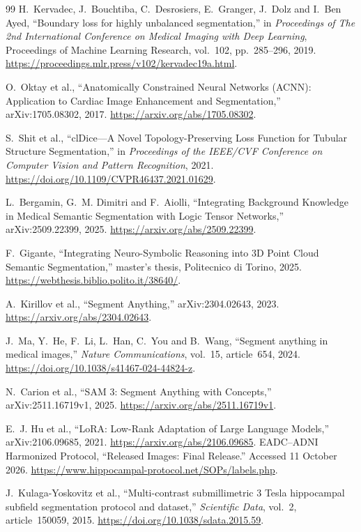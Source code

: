 \documentclass[12pt,a4paper]{article}
\begin{document}
\begin{thebibliography}{99}
H.~Kervadec, J.~Bouchtiba, C.~Desrosiers, E.~Granger, J.~Dolz and
I.~Ben Ayed, ``Boundary loss for highly unbalanced segmentation,''
in \emph{Proceedings of The 2nd International Conference on Medical
Imaging with Deep Learning}, Proceedings of Machine Learning Research,
vol.~102, pp.~285--296, 2019.
\url{https://proceedings.mlr.press/v102/kervadec19a.html}.

O.~Oktay et al., ``Anatomically Constrained Neural Networks (ACNN):
Application to Cardiac Image Enhancement and Segmentation,''
arXiv:1705.08302, 2017. \url{https://arxiv.org/abs/1705.08302}.

S.~Shit et al., ``clDice---A Novel Topology-Preserving Loss Function
for Tubular Structure Segmentation,'' in \emph{Proceedings of the
IEEE/CVF Conference on Computer Vision and Pattern Recognition}, 2021.
\url{https://doi.org/10.1109/CVPR46437.2021.01629}.

L.~Bergamin, G.~M. Dimitri and F.~Aiolli, ``Integrating Background
Knowledge in Medical Semantic Segmentation with Logic Tensor Networks,''
arXiv:2509.22399, 2025. \url{https://arxiv.org/abs/2509.22399}.

F.~Gigante, ``Integrating Neuro-Symbolic Reasoning into 3D Point Cloud
Semantic Segmentation,'' master's thesis, Politecnico di Torino, 2025.
\url{https://webthesis.biblio.polito.it/38640/}.

A.~Kirillov et al., ``Segment Anything,'' arXiv:2304.02643, 2023.
\url{https://arxiv.org/abs/2304.02643}.

J.~Ma, Y.~He, F.~Li, L.~Han, C.~You and B.~Wang,
``Segment anything in medical images,'' \emph{Nature Communications},
vol.~15, article~654, 2024.
\url{https://doi.org/10.1038/s41467-024-44824-z}.

N.~Carion et al., ``SAM 3: Segment Anything with Concepts,''
arXiv:2511.16719v1, 2025. \url{https://arxiv.org/abs/2511.16719v1}.

E.~J. Hu et al., ``LoRA: Low-Rank Adaptation of Large Language Models,''
arXiv:2106.09685, 2021. \url{https://arxiv.org/abs/2106.09685}.
EADC--ADNI Harmonized Protocol, ``Released Images: Final Release.''
Accessed 11 October 2026.
\url{https://www.hippocampal-protocol.net/SOPs/labels.php}.

J.~Kulaga-Yoskovitz et al., ``Multi-contrast submillimetric 3 Tesla
hippocampal subfield segmentation protocol and dataset,''
\emph{Scientific Data}, vol.~2, article~150059, 2015.
\url{https://doi.org/10.1038/sdata.2015.59}.


\end{thebibliography}
\end{document}

